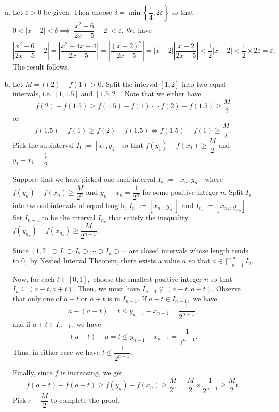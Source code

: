 \documentclass{article}
\begin{document}
\begin{enumerate}[(a)]
        \item Let $\varepsilon>0$ be given. Then choose $\delta=\min\left\{\dfrac{1}{4},2\varepsilon\right\}$ so that $0<|x-2|<\delta\implies\left|\dfrac{x^2-6}{2x-5}-2\right|<\varepsilon.$ We have
        $$\left|\dfrac{x^2-6}{2x-5}-2\right|=\left|\frac{x^2-4x+4}{2x-5}\right|=
        \left|\frac{(x-2)^2}{2x-5}\right|=|x-2|\left|\frac{x-2}{2x-5}\right|<\frac{1}{2}|x-2|<\frac{1}{2}\times2\varepsilon=\varepsilon.$$
        The result follows.
        \item Let $M=f(2)-f(1)>0.$ Split the interval $[1,2]$ into two equal intervals, i.e. $[1,1.5]$ and $[1.5,2].$ Note that we either have $$f(2)-f(1.5)\geq f(1.5)-f(1)\iff f(2)-f(1.5)\geq \frac{M}{2}$$ or $$f(1.5)-f(1)\geq f(2)-f(1.5)\iff f(1.5)-f(1)\geq \frac{M}{2}.$$
        Pick the subinterval $I_1:=[x_1,y_1]$ so that $f(y_1)-f(x_1)\geq \dfrac{M}{2}$ and $y_1-x_1=\dfrac{1}{2}.$
        
        Suppose that we have picked one such interval $I_n:=[x_n,y_n]$ where $f(y_n)-f(x_n)\geq\dfrac{M}{2^n}$ and $y_n-x_n=\dfrac{1}{2^n}$ for some positive integer $n.$ Split $I_n$ into two subintervals of equal length, $I_{n_1}:=[x_{n_1}, y_{n_1}]$ and $I_{n_2}:=[x_{n_2}, y_{n_2}].$ Set $I_{n+1}$ to be the interval $I_{n_k}$ that satisfy the inequality $f(y_{n_k})-f(x_{n_k})\geq\dfrac{M}{2^{n+1}}.$
        
        Since $[1,2]\supset I_1\supset I_2\supset\cdots \supset I_n\supset\cdots$ are closed intervals whose length tends to $0,$ by Nested Interval Theorem, there exists a value $a$ so that $a\in\displaystyle\bigcap^{\infty}_{n=1}I_n.$
        
        Now, for each $t\in[0,1],$ choose the smallest positive integer $n$ so that $I_n\subseteq (a-t,a+t).$ Then, we must have $I_{n-1}\not\subseteq(a-t,a+t).$ Observe that only one of $a-t$ or $a+t$ is in $I_{n-1}.$ If $a-t\in I_{n-1},$ we have $$a-(a-t)=t\leq y_{n-1}-x_{n-1}=\dfrac{1}{2^{n-1}},$$ and if $a+t\in I_{n-1},$ we have $$(a+t)-a=t\leq y_{n-1}-x_{n-1}=\dfrac{1}{2^{n-1}}.$$ Thus, in either case we have $t\leq\dfrac{1}{2^{n-1}}.$
        
        Finally, since $f$ is increasing, we get $$f(a+t)-f(a-t)\geq f(y_n)-f(x_n)\geq \frac{M}{2^n}=\frac{M}{2}\times\frac{1}{2^{n-1}}\geq\frac{M}{2}t.$$
        Pick $c=\dfrac{M}{2}$ to complete the proof.
\end{enumerate}
\end{document}
